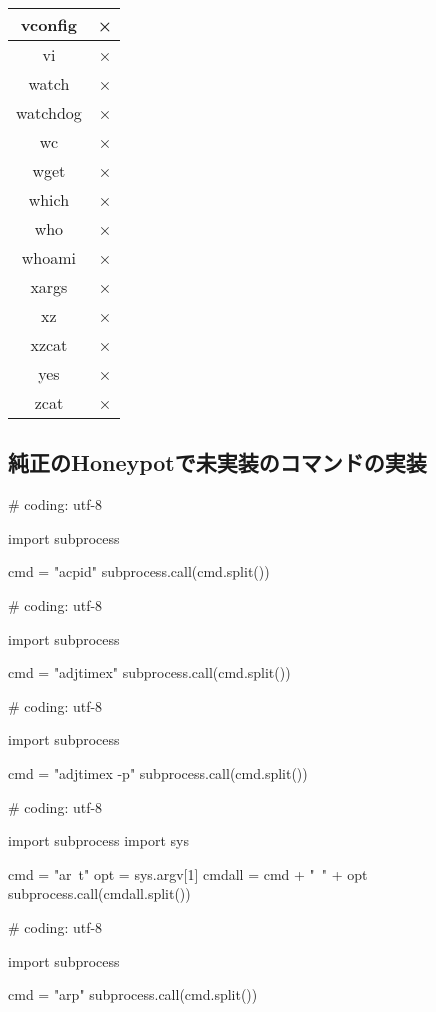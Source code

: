 \begin{longtable}{cc}
vconfig & × \\ \hline
vi & × \\ \hline
watch & × \\ \hline
watchdog & × \\ \hline
wc & × \\ \hline
wget & × \\ \hline
which & × \\ \hline
who & × \\ \hline
whoami & × \\ \hline
xargs & × \\ \hline
xz & × \\ \hline
xzcat & × \\ \hline
yes & × \\ \hline
zcat & × \\ \hline
\end{longtable}

\subsection{純正のHoneypotで未実装のコマンドの実装}
\label{appd:implofcommand}

\begin{mylisting}[label={lst:acpid},language=sh,caption=acpid]
# coding: utf-8

import subprocess

cmd = "acpid"
subprocess.call(cmd.split())
\end{mylisting}

\begin{mylisting}[label={lst:acpid},language=sh,caption=adjtimex]
# coding: utf-8

import subprocess

cmd = "adjtimex"
subprocess.call(cmd.split())

\end{mylisting}


\begin{mylisting}[label={lst:acpid},language=sh,caption=adjtimex -p]
# coding: utf-8

import subprocess

cmd = "adjtimex -p"
subprocess.call(cmd.split())

\end{mylisting}


\begin{mylisting}[label={lst:acpid},language=sh,caption=ar]
# coding: utf-8

import subprocess
import sys

cmd = "ar\ t"
opt = sys.argv[1]
cmdall = cmd + "\ " + opt
subprocess.call(cmdall.split())

\end{mylisting}
\begin{mylisting}[label={lst:acpid},language=sh,caption=arp]
# coding: utf-8

import subprocess

cmd = "arp"
subprocess.call(cmd.split())

\end{mylisting}

